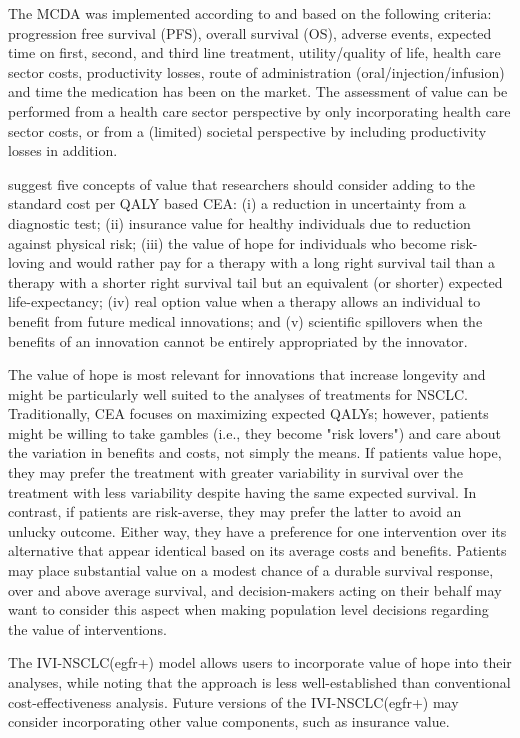 \documentclass[11pt,final,fleqn]{article}\usepackage[]{graphicx}\usepackage[]{color}
\theoremstyle{plain}
\begin{document}
{The MCDA was implemented according to \citet{thokala2016multiple} and based on the following criteria: progression free survival (PFS), overall survival (OS), adverse events, expected time on first, second, and third line treatment, utility/quality of life, health care sector costs, productivity losses, route of administration (oral/injection/infusion) and time the medication has been on the market. The assessment of value can be performed from a health care sector perspective by only incorporating health care sector costs, or from a (limited) societal perspective by including productivity losses in addition.

\citet{garrison2017toward} suggest five concepts of value that researchers should consider adding to the standard cost per QALY based CEA: (i) a reduction in uncertainty from a diagnostic test; (ii) insurance value for healthy individuals due to reduction against physical risk; (iii) the value of hope for individuals who become risk-loving and would rather pay for a therapy with a long right survival tail than a therapy with a shorter right survival tail but an equivalent (or shorter) expected life-expectancy; (iv) real option value when a therapy allows an individual to benefit from future medical innovations; and (v) scientific spillovers when the benefits of an innovation cannot be entirely appropriated by the innovator.

The value of hope is most relevant for innovations that increase longevity and might be particularly well suited to the analyses of treatments for NSCLC. Traditionally, CEA focuses on maximizing expected QALYs; however, patients might be willing to take gambles (i.e., they become "risk lovers") and care about the variation in benefits and costs, not simply the means. If patients value hope, they may prefer the treatment with greater variability in survival over the treatment with less variability despite having the same expected survival. In contrast, if patients are risk-averse, they may prefer the latter to avoid an unlucky outcome. Either way, they have a preference for one intervention over its alternative that appear identical based on its average costs and benefits. Patients may place substantial value on a modest chance of a durable survival response, over and above average survival, and decision-makers acting on their behalf may want to consider this aspect when making population level decisions regarding the value of interventions. 

The IVI-NSCLC(egfr+) model allows users to incorporate value of hope into their analyses, while noting that the approach is less well-established than conventional cost-effectiveness analysis. Future versions of the IVI-NSCLC(egfr+) may consider incorporating other value components, such as insurance value.

}
\end{document}
